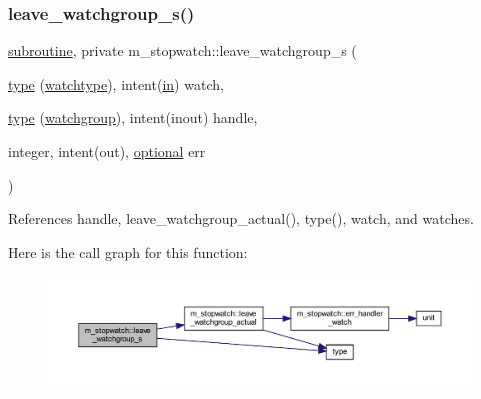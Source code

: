 \subsubsection{\texorpdfstring{leave\+\_\+watchgroup\+\_\+s()}{leave\_watchgroup\_s()}}
{\footnotesize\ttfamily \hyperlink{M__stopwatch_83_8txt_acfbcff50169d691ff02d4a123ed70482}{subroutine}, private m\+\_\+stopwatch\+::leave\+\_\+watchgroup\+\_\+s (\begin{DoxyParamCaption}\item[{\hyperlink{stop__watch_83_8txt_a70f0ead91c32e25323c03265aa302c1c}{type} (\hyperlink{structm__stopwatch_1_1watchtype}{watchtype}), intent(\hyperlink{M__journal_83_8txt_afce72651d1eed785a2132bee863b2f38}{in})}]{watch,  }\item[{\hyperlink{stop__watch_83_8txt_a70f0ead91c32e25323c03265aa302c1c}{type} (\hyperlink{structm__stopwatch_1_1watchgroup}{watchgroup}), intent(inout)}]{handle,  }\item[{integer, intent(out), \hyperlink{option__stopwatch_83_8txt_aa4ece75e7acf58a4843f70fe18c3ade5}{optional}}]{err }\end{DoxyParamCaption})\hspace{0.3cm}{\ttfamily [private]}}



References handle, leave\+\_\+watchgroup\+\_\+actual(), type(), watch, and watches.

Here is the call graph for this function\+:
\nopagebreak
\begin{figure}[H]
\begin{center}
\leavevmode
\includegraphics[width=350pt]{namespacem__stopwatch_a9acf515866a63a203530c03d8fe59b98_cgraph}
\end{center}
\end{figure}
\mbox{\label{namespacem__stopwatch_a01b27391a14a126d017fdacb139d92ca}} 
